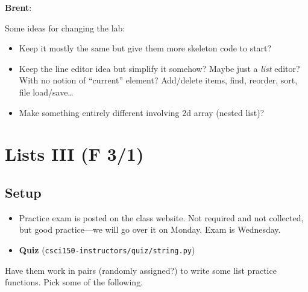 \documentclass{article}
\newenvironment{reflect}[1]
{
  \noindent
  \begin{lrbox}{\reflectbox}
    \begin{minipage}[t]{\textwidth}
      \textbf{#1}:
}{
    \end{minipage}
  \end{lrbox}
  \fbox{\usebox{\reflectbox}}
}
\newcommand{\ready}{\textcolor{Green}{\Checkmark}\xspace}
\begin{document}
\begin{reflect}{Brent}
  Some ideas for changing the lab:
  \begin{itemize}
  \item Keep it mostly the same but give them more skeleton code to
    start?
  \item Keep the line editor idea but simplify it somehow? Maybe just
    a \emph{list} editor?  With no notion of ``current'' element?
    Add/delete items, find, reorder, sort, file load/save\dots
  \item Make something entirely different involving 2d array (nested
    list)?
  \end{itemize}
\end{reflect}

\newpage
\section{\ready Lists III (F 3/1)}

\subsection*{Setup}

\begin{itemize}
\item \ready Practice exam is posted on the class website.  Not required and
  not collected, but good practice---we will go over it on Monday.
  Exam is Wednesday.
\item \ready \textbf{Quiz} (\texttt{csci150-instructors/quiz/string.py})
\end{itemize}

Have them work in pairs (randomly assigned?) to write some list
practice functions.  Pick some of the following.
\end{document}

